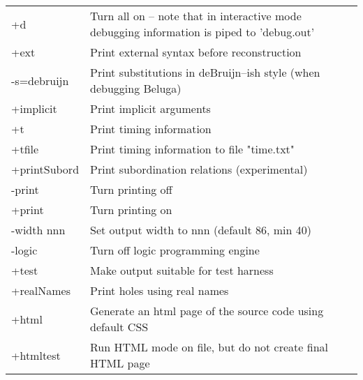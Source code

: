 \documentclass[11pt]{article}
\begin{document}
\begin{tabular}{ | p{0.2\linewidth} p{0.8\linewidth} }
    +d                      & Turn all on -- note that in interactive mode debugging information is piped to 'debug.out'           \\
    +ext                    & Print external syntax before reconstruction                                                          \\
    -s=debruijn             & Print substitutions in deBruijn--ish style (when debugging Beluga)                                   \\
    +implicit               & Print implicit arguments                                                                             \\
    +t                      & Print timing information                                                                             \\
    +tfile                  & Print timing information to file "time.txt"                                                          \\
    +printSubord            & Print subordination relations (experimental)                                                         \\
    -print                  & Turn printing off                                                                                    \\
    +print                  & Turn printing on                                                                                     \\
    -width nnn              & Set output width to nnn (default 86, min 40)                                                         \\
    -logic                  & Turn off logic programming engine                                                                    \\
    +test                   & Make output suitable for test harness                                                                \\
    +realNames              & Print holes using real names                                                                         \\
    +html                   & Generate an html page of the source code using default CSS                                           \\
    +htmltest               & Run HTML mode on file, but do not create final HTML page                                             \\

\end{tabular}
\end{document}
